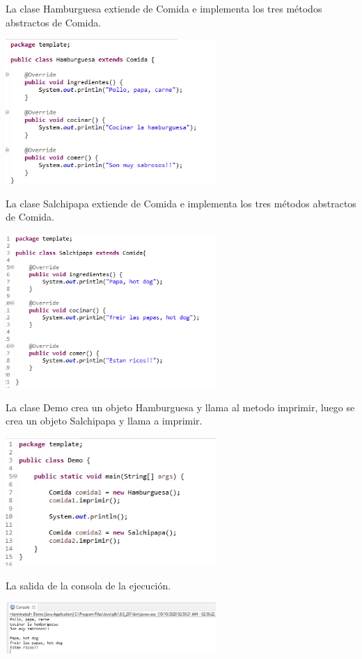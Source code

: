 \documentclass[twoside,twocolumn]{article}
\begin{document}
La clase Hamburguesa extiende de Comida e implementa los tres métodos abstractos de Comida.

\includegraphics[width=8cm]{Imagenes/imagen2}

La clase Salchipapa extiende de Comida e implementa los tres métodos abstractos de Comida.

\includegraphics[width=8cm]{Imagenes/imagen3}

La clase Demo crea un objeto Hamburguesa y llama al metodo imprimir, luego se crea un objeto Salchipapa y llama a imprimir.

\includegraphics[width=8cm]{Imagenes/imagen4}

La salida de la consola de la ejecución.

\includegraphics[width=8cm]{Imagenes/imagen5}
\end{document}
